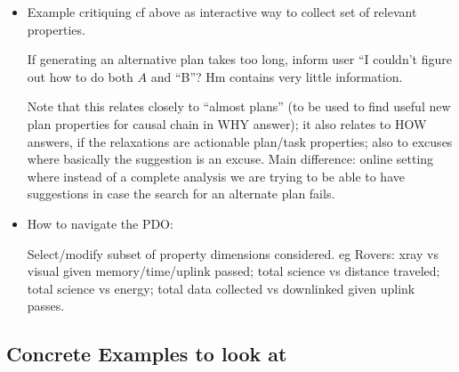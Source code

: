\begin{itemize}
\item Example critiquing cf above as interactive way to collect set of
  relevant properties.

  If generating an alternative plan takes too long, inform user ``I
  couldn't figure out how to do both $A$ and ``B''? Hm contains very
  little information. 

   Note that this relates closely
  to ``almost plans'' (to be used to find useful new plan properties
  for causal chain in WHY answer); it also relates to HOW answers, if
  the relaxations are actionable plan/task properties; also to excuses
  where basically the suggestion is an excuse. Main difference: online
  setting where instead of a complete analysis we are trying to be
  able to have suggestions in case the search for an alternate plan
  fails.

\item How to navigate the PDO:

  Select/modify subset of property dimensions considered. eg Rovers:
  xray vs visual given memory/time/uplink passed; total science vs
  distance traveled; total science vs energy; total data collected vs
  downlinked given uplink passes.

\end{itemize}










\subsection{Concrete Examples to look at}

